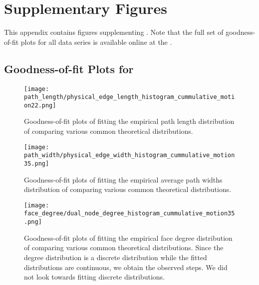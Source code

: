 
\chapter{Supplementary Figures}\label{app:network_analysis}

This appendix contains figures supplementing . Note that the full set of goodness-of-fit plots for all data series is available online at the \SMGR. 

\section{Goodness-of-fit Plots for }

\begin{figure}[!htbp]
\begin{center}%
  \texttt{[image: path\_length/physical\_edge\_length\_histogram\_cummulative\_motion22.png]}
\end{center}%
\caption[Goodness-of-fit plots - Path length]{Goodness-of-fit plots of fitting the empirical path length distribution of  comparing various common theoretical distributions.}
\label{fig:sup::path_lengths_goodness}
\end{figure}

\begin{figure}[!htbp]
\begin{center}%
  \texttt{[image: path\_width/physical\_edge\_width\_histogram\_cummulative\_motion35.png]}
\end{center}%
\caption[Goodness-of-fit plots - Path width]{Goodness-of-fit plots of fitting the empirical average path widths distribution of  comparing various common theoretical distributions.}
\label{fig:sup::path_widths_goodness}
\end{figure}

\begin{figure}[!htbp]
\begin{center}%
  \texttt{[image: face\_degree/dual\_node\_degree\_histogram\_cummulative\_motion35.png]}
\end{center}%
\caption[Goodness-of-fit plots - Face degree]{Goodness-of-fit plots of fitting the empirical face degree distribution of  comparing various common theoretical distributions. Since the degree distribution is a discrete distribution while the fitted distributions are continuous, we obtain the observed steps. We did not look towards fitting discrete distributions.}
\label{fig:sup::face_degree_goodness}
\end{figure}

